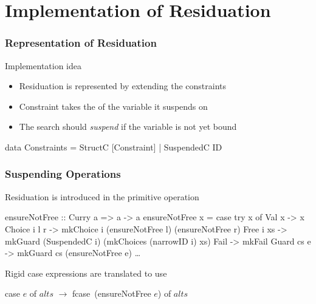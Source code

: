 \documentclass[
,hyperref={pdfpagelabels=false}
,xcolor=dvipsnames
]{beamer}
\newcommand{\blocktitle}[1]{%
{\medskip\usebeamerfont{subtitle}\usebeamercolor[fg]{subtitle}#1\smallskip}
}
\begin{document}

\section{Implementation of Residuation}

\begin{frame}[fragile]%
\frametitle{Representation of Residuation}

\blocktitle{Implementation idea}

\begin{itemize}
\item Residuation is represented by extending the constraints
\item Constraint takes the  of the variable it suspends on
\item The search should \emph{suspend} if the variable is not yet bound
\end{itemize}

\begin{haskell}
data Constraints = StructC [Constraint]
                 \alert{| SuspendedC ID}
\end{haskell}

\end{frame}

\begin{frame}[fragile]%
\frametitle{Suspending Operations}

Residuation is introduced in the primitive operation 

\begin{haskell}
ensureNotFree :: Curry a => a -> a
ensureNotFree x = case try x of
  Val x        -> x
  Choice i l r -> mkChoice i (ensureNotFree l) (ensureNotFree r)
  \alert{Free i xs    -> mkGuard (SuspendedC i) (mkChoices (narrowID i) xs)}
  Fail         -> mkFail
  Guard cs e   -> mkGuard cs (ensureNotFree e)
  \ldots
\end{haskell}

Rigid case expressions are translated to use 

\begin{example}
case $e$ of $alts$ $\to$ fcase\footnotemark~(ensureNotFree $e$) of $alts$
\end{example}
\end{frame}
\end{document}
